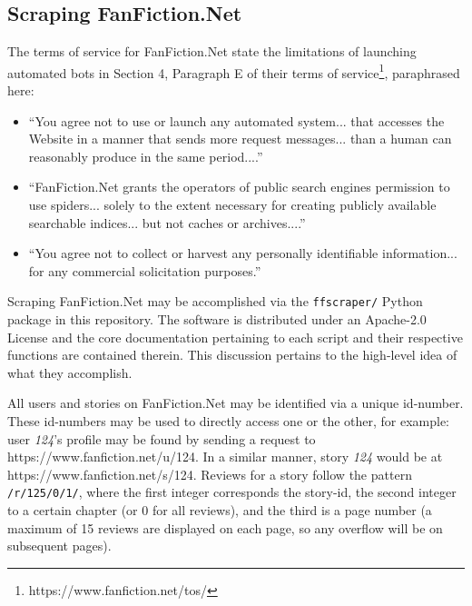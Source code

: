 \documentclass[letterpaper]{article}
\begin{document}
\subsection{Scraping FanFiction.Net}

The terms of service for FanFiction.Net state the limitations of launching automated bots in Section 4, Paragraph E of their terms of service\footnote{https://www.fanfiction.net/tos/}, paraphrased here:

\begin{itemize}
    \item ``You agree not to use or launch any automated system... that accesses the Website in a manner that sends more request messages... than a human can reasonably produce in the same period....''
    \item ``FanFiction.Net grants the operators of public search engines permission to use spiders... solely to the extent necessary for creating publicly available searchable indices... but not caches or archives....''
    \item ``You agree not to collect or harvest any personally identifiable information... for any commercial solicitation purposes.''
\end{itemize}

Scraping FanFiction.Net may be accomplished via the \texttt{ffscraper/} Python package in this repository. The software is distributed under an Apache-2.0 License and the core documentation pertaining to each script and their respective functions are contained therein.  This discussion pertains to the high-level idea of what they accomplish.

All users and stories on FanFiction.Net may be identified via a unique id-number. These id-numbers may be used to directly access one or the other, for example: user \textit{124}'s profile may be found by sending a request to https://www.fanfiction.net/u/124. In a similar manner, story \textit{124} would be at https://www.fanfiction.net/s/124. Reviews for a story follow the pattern \texttt{/r/125/0/1/}, where the first integer corresponds the story-id, the second integer to a certain chapter (or 0 for all reviews), and the third is a page number (a maximum of 15 reviews are displayed on each page, so any overflow will be on subsequent pages).



\end{document}
